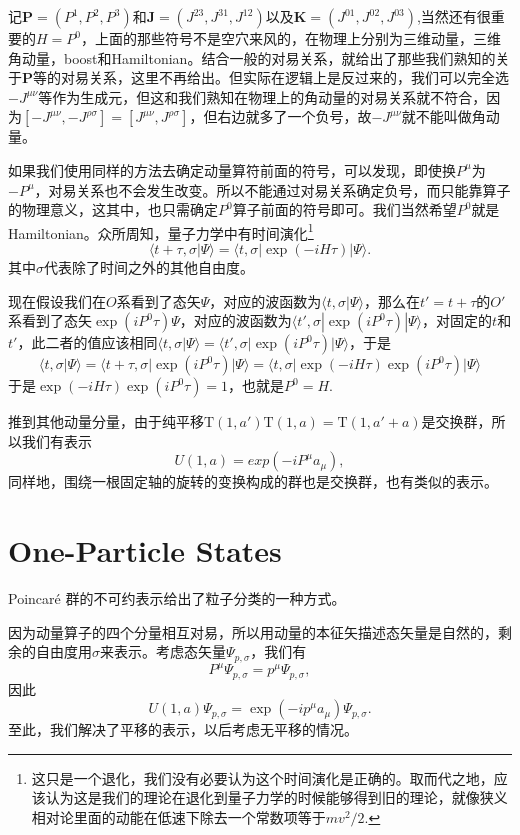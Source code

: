 \documentclass[9pt]{extbook}
\begin{document}
记$\bm{P}=(P^1,P^2,P^3)$和$\bm{J}=(J^{23},J^{31},J^{12})$以及$\bm{K}=(J^{01},J^{02},J^{03})$,当然还有很重要的$H=P^0$，上面的那些符号不是空穴来风的，在物理上分别为三维动量，三维角动量，boost和Hamiltonian。结合一般的对易关系，就给出了那些我们熟知的关于$\bm{P}$等的对易关系，这里不再给出。但实际在逻辑上是反过来的，我们可以完全选$-J^{\mu\nu}$等作为生成元，但这和我们熟知在物理上的角动量的对易关系就不符合，因为$[-J^{\mu\nu},-J^{\rho\sigma}]=[J^{\mu\nu},J^{\rho\sigma}]$，但右边就多了一个负号，故$-J^{\mu\nu}$就不能叫做角动量。

如果我们使用同样的方法去确定动量算符前面的符号，可以发现，即使换$P^\mu$为$-P^\mu$，对易关系也不会发生改变。所以不能通过对易关系确定负号，而只能靠算子的物理意义，这其中，也只需确定$P^0$算子前面的符号即可。我们当然希望$P^0$就是Hamiltonian。众所周知，量子力学中有时间演化\footnote{这只是一个退化，我们没有必要认为这个时间演化是正确的。取而代之地，应该认为这是我们的理论在退化到量子力学的时候能够得到旧的理论，就像狭义相对论里面的动能在低速下除去一个常数项等于$mv^2/2$.}
\[\langle t+\tau,\sigma|\Psi\rangle=\langle t,\sigma|\exp (-iH\tau)|\Psi\rangle.\]
其中$\sigma$代表除了时间之外的其他自由度。

现在假设我们在$O$系看到了态矢$\Psi$，对应的波函数为$\langle t,\sigma|\Psi\rangle$，那么在$t'=t+\tau$的$O'$系看到了态矢$\exp (iP^0\tau)\Psi$，对应的波函数为$\langle t',\sigma|\exp (iP^0\tau)|\Psi\rangle$，对固定的$t$和$t'$，此二者的值应该相同$\langle t,\sigma|\Psi\rangle=\langle t',\sigma|\exp (iP^0\tau)|\Psi\rangle$，于是
\[
\langle t,\sigma|\Psi\rangle=\langle t+\tau,\sigma|\exp (iP^0\tau)|\Psi\rangle=\langle t,\sigma|\exp (-iH\tau)\exp (iP^0\tau)|\Psi\rangle
\]
于是$\exp (-iH\tau)\exp (iP^0\tau)=1$，也就是$P^0=H$.

推到其他动量分量，由于纯平移$\mathrm{T}(1,a')\mathrm{T}(1,a)=\mathrm{T}(1,a'+a)$是交换群，所以我们有表示
\[
U(1,a)=exp\left(-iP^\mu a_\mu\right),
\]
同样地，围绕一根固定轴的旋转的变换构成的群也是交换群，也有类似的表示。

\section{One-Particle States}

Poincar\'{e} 群的不可约表示给出了粒子分类的一种方式。

因为动量算子的四个分量相互对易，所以用动量的本征矢描述态矢量是自然的，剩余的自由度用$\sigma$来表示。考虑态矢量$\Psi_{p,\sigma}$，我们有
\[
P^\mu\Psi_{p,\sigma}=p^\mu\Psi_{p,\sigma},
\]
因此
\[
U(1,a)\Psi_{p,\sigma}=\exp\left(-ip^\mu a_\mu\right)\Psi_{p,\sigma}.
\]
至此，我们解决了平移的表示，以后考虑无平移的情况。
\end{document}
